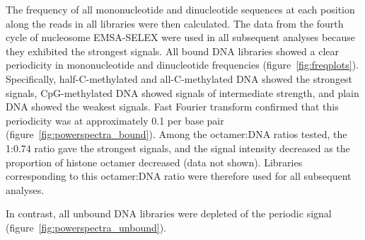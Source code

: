 \documentclass[parskip=full, numbers=noenddot]{scrbook}
\begin{document}
The frequency of all mononucleotide and dinucleotide sequences at each position along the reads in all libraries were then calculated.  The data from the fourth cycle of nucleosome EMSA-SELEX were used in all subsequent analyses because they exhibited the strongest signals.  All bound DNA libraries showed a clear periodicity in mononucleotide and dinucleotide frequencies (figure~\ref{fig:freqplots}).  Specifically, half-C-methylated and all-C-methylated DNA showed the strongest signals, CpG-methylated DNA showed signals of intermediate strength, and plain DNA showed the weakest signals.  Fast Fourier transform confirmed that this periodicity was at approximately 0.1 per base pair (figure~\ref{fig:powerspectra_bound}).  Among the octamer:DNA ratios tested, the 1:0.74 ratio gave the strongest signals, and the signal intensity decreased as the proportion of histone octamer decreased (data not shown).  Libraries corresponding to this octamer:DNA ratio were therefore used for all subsequent analyses.

In contrast, all unbound DNA libraries were depleted of the periodic signal (figure~\ref{fig:powerspectra_unbound}).
\end{document}
